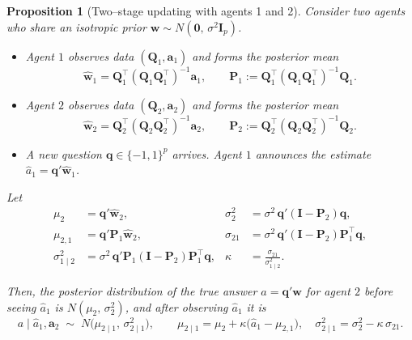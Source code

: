 \documentclass[\ifdraft draft\fi]{article}
\newtheorem{proposition}{Proposition}
\begin{document}
\begin{proposition}[Two–stage updating with agents 1 and 2]
Consider two agents who share an isotropic prior $\bm{w}\sim N(\bm{0},\,\sigma^{2}\bm{I}_p)$.  

   \begin{itemize}[nosep]
      \item Agent $1$ observes data $(\bm{Q}_1,\bm{a}_1)$ and forms the posterior mean
      \[\hat{\bm w}_1 = \bm{Q}_1^{\top}(\bm{Q}_1\bm{Q}_1^{\top})^{-1}\bm{a}_1, \qquad \bm{P}_1 := \bm{Q}_1^{\top}(\bm{Q}_1\bm{Q}_1^{\top})^{-1}\bm{Q}_1.\]
      \item Agent $2$ observes data $(\bm{Q}_2,\bm{a}_2)$ and forms the posterior mean
      \[\hat{\bm w}_2 = \bm{Q}_2^{\top}(\bm{Q}_2\bm{Q}_2^{\top})^{-1}\bm{a}_2, \qquad \bm{P}_2 := \bm{Q}_2^{\top}(\bm{Q}_2\bm{Q}_2^{\top})^{-1}\bm{Q}_2.\]
      \item A new question $\bm{q}\in\{-1,1\}^{p}$ arrives.  Agent $1$ announces the estimate $\hat{a}_1 = \bm{q}'\hat{\bm w}_1$.
   \end{itemize}

Let
   \begin{align}
      \mu_2 &= \bm{q}'\hat{\bm w}_2, &  \sigma_2^{2} &= \sigma^{2}\,\bm{q}'(\bm{I}-\bm{P}_2)\bm{q},\\
      \mu_{2,1} &= \bm{q}'\bm{P}_1\hat{\bm w}_2, & \sigma_{21} &= \sigma^{2}\,\bm{q}'(\bm{I}-\bm{P}_2)\bm{P}_1^{\top}\bm{q},\\
      \sigma_{1\mid 2}^{2} &= \sigma^{2}\,\bm{q}'\bm{P}_1(\bm{I}-\bm{P}_2)\bm{P}_1^{\top}\bm{q}, & \kappa &= \frac{\sigma_{21}}{\sigma_{1\mid2}^{2}}.
   \end{align}

Then, the posterior distribution of the true answer $a=\bm{q}'\bm{w}$ for agent $2$ before seeing $\hat{a}_1$ is $N(\mu_2,\,\sigma_2^{2})$, and after observing $\hat{a}_1$ it is
   $$
      a\mid \hat{a}_1,\bm{a}_2 \;\sim\; N\bigl(\mu_{2\mid1},\,\sigma_{2\mid1}^{2}\bigr),\qquad
      \mu_{2\mid1}=\mu_{2}+\kappa\bigl(\hat{a}_1-\mu_{2,1}\bigr),\quad
      \sigma_{2\mid1}^{2}=\sigma_{2}^{2}-\kappa\,\sigma_{21}.
   $$
\end{proposition}
\end{document}
